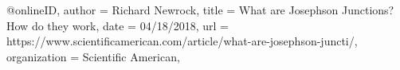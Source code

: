 @online{ID,
	author = {Richard Newrock},
	title = {What are Josephson Junctions? How do they work},
	date = {04/18/2018},
	url = {https://www.scientificamerican.com/article/what-are-josephson-juncti/},
	organization = {Scientific American},
}
